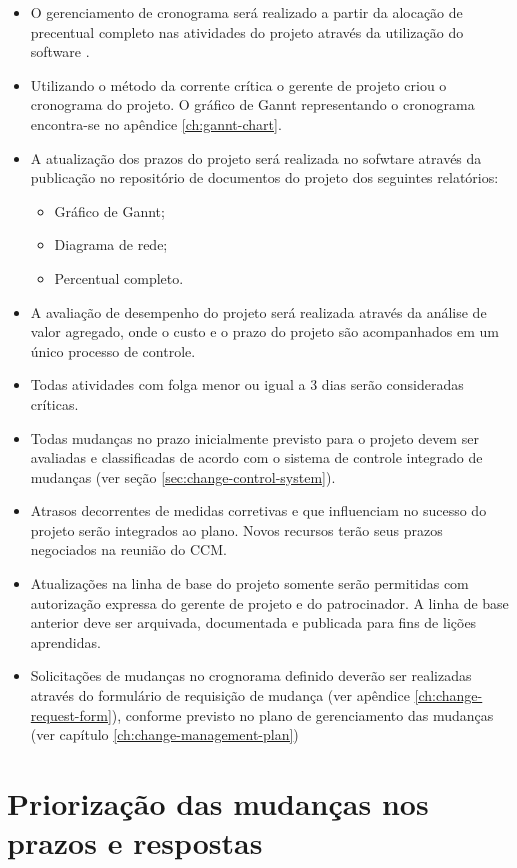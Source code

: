 \begin{itemize}
	\item O gerenciamento de cronograma será realizado a partir da alocação de precentual completo nas atividades do projeto através da utilização do software \projectManagementSoftwareName.
    \item Utilizando o método da corrente crítica o gerente de projeto criou o cronograma do projeto. O gráfico de Gannt representando o cronograma encontra-se no apêndice \ref{ch:gannt-chart}.
	\item A atualização dos prazos do projeto será realizada no sofwtare \projectManagementSoftwareName através da publicação no repositório de documentos do projeto dos seguintes relatórios:
	      \begin{itemize}
		      \item Gráfico de Gannt;
		      \item Diagrama de rede;
		      \item Percentual completo.
	      \end{itemize}
	\item A avaliação de desempenho do projeto será realizada através da análise de valor agregado, onde o custo e o prazo do projeto são acompanhados em um único processo de controle.
	\item Todas atividades com folga menor ou igual a 3 dias serão consideradas críticas.
	\item Todas mudanças no prazo inicialmente previsto para o projeto devem ser avaliadas e classificadas de acordo com o sistema de controle integrado de mudanças (ver seção \ref{sec:change-control-system}).
	\item Atrasos decorrentes de medidas corretivas e que influenciam no sucesso do projeto serão integrados ao plano. Novos recursos terão seus prazos negociados na reunião do CCM.
	\item Atualizações na linha de base do projeto somente serão permitidas com autorização expressa do gerente de projeto e do patrocinador. A linha de base anterior deve ser arquivada, documentada e publicada para fins de lições aprendidas.
	\item Solicitações de mudanças no crognorama definido deverão ser realizadas através do formulário de requisição de mudança (ver apêndice \ref{ch:change-request-form}), conforme previsto no plano de gerenciamento das mudanças (ver capítulo \ref{ch:change-management-plan})
\end{itemize}

\section{Priorização das mudanças nos prazos e respostas}

